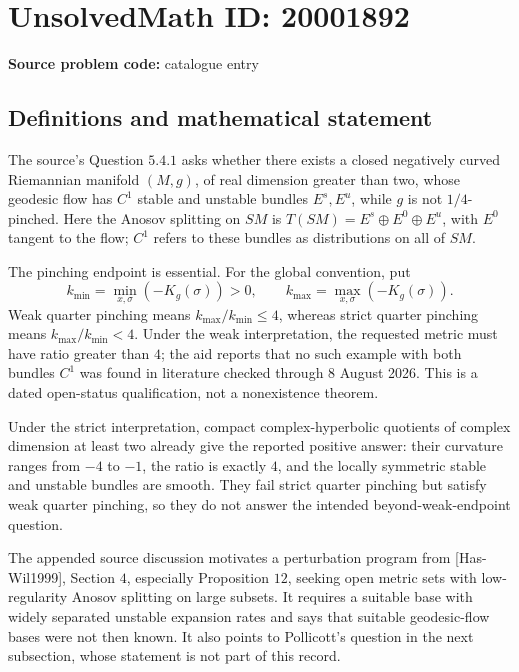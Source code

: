 \documentclass[11pt]{article}
\begin{document}
\section*{UnsolvedMath ID: 20001892}
\textbf{Source problem code:} catalogue entry
\subsection{Definitions and mathematical statement}
The source's Question \(5.4.1\) asks whether there exists a closed negatively curved Riemannian manifold \((M,g)\), of real dimension greater than two, whose geodesic flow has \(C^1\) stable and unstable bundles \(E^s,E^u\), while \(g\) is not \(1/4\)-pinched. Here the Anosov splitting on \(SM\) is \(T(SM)=E^s\oplus E^0\oplus E^u\), with \(E^0\) tangent to the flow; \(C^1\) refers to these bundles as distributions on all of \(SM\).

The pinching endpoint is essential. For the global convention, put
\[
 k_{\min}=\min_{x,\sigma}(-K_g(\sigma))>0,\qquad
 k_{\max}=\max_{x,\sigma}(-K_g(\sigma)).
\]
Weak quarter pinching means \(k_{\max}/k_{\min}\leq4\), whereas strict quarter pinching means \(k_{\max}/k_{\min}<4\). Under the weak interpretation, the requested metric must have ratio greater than \(4\); the aid reports that no such example with both bundles \(C^1\) was found in literature checked through 8 August 2026. This is a dated open-status qualification, not a nonexistence theorem.

Under the strict interpretation, compact complex-hyperbolic quotients of complex dimension at least two already give the reported positive answer: their curvature ranges from \(-4\) to \(-1\), the ratio is exactly \(4\), and the locally symmetric stable and unstable bundles are smooth. They fail strict quarter pinching but satisfy weak quarter pinching, so they do not answer the intended beyond-weak-endpoint question.

The appended source discussion motivates a perturbation program from [Has-Wil1999], Section \(4\), especially Proposition \(12\), seeking open metric sets with low-regularity Anosov splitting on large subsets. It requires a suitable base with widely separated unstable expansion rates and says that suitable geodesic-flow bases were not then known. It also points to Pollicott's question in the next subsection, whose statement is not part of this record.
\end{document}
